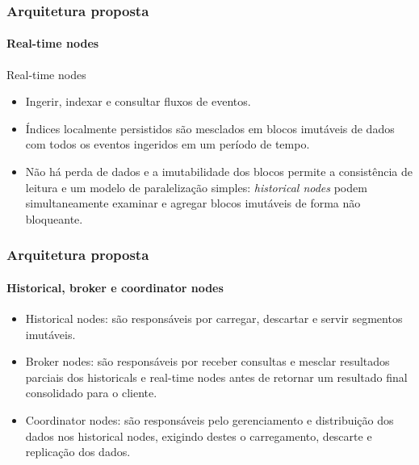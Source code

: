 \documentclass{beamer}
\begin{document}
\begin{frame}
\frametitle{Arquitetura proposta}
\framesubtitle{Real-time nodes}
\alert{Real-time nodes}
\begin{itemize}
\item Ingerir, indexar e consultar fluxos de eventos. 
\item Índices localmente persistidos são mesclados em \alert{blocos imutáveis} de dados com todos os eventos ingeridos em um período de tempo.
\item \alert{Não há perda de dados e a imutabilidade dos blocos permite a consistência de leitura e um modelo de paralelização simples}: \textit{historical nodes} podem simultaneamente examinar e agregar blocos imutáveis de forma não bloqueante.
\end{itemize}
\end{frame}
\begin{frame}
\frametitle{Arquitetura proposta}
\framesubtitle{Historical, broker e coordinator nodes}
\begin{itemize}
    \item \alert{Historical nodes}: são responsáveis por carregar, descartar e servir segmentos imutáveis.
    \item\alert{Broker nodes}: são responsáveis por receber consultas e mesclar resultados parciais dos historicals e real-time nodes antes de retornar um resultado final consolidado para o cliente.
    \item \alert{Coordinator nodes}: são responsáveis pelo gerenciamento e distribuição dos dados nos historical nodes, exigindo destes o carregamento, descarte e replicação dos dados.
\end{itemize}
\end{frame}
\end{document}
